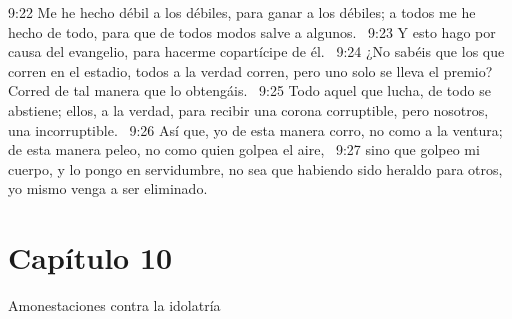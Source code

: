 9:22 Me he hecho débil a los débiles, para ganar a los débiles; a todos me he hecho de todo, para que de todos modos salve a algunos.  
9:23 Y esto hago por causa del evangelio, para hacerme copartícipe de él.  
9:24 ¿No sabéis que los que corren en el estadio, todos a la verdad corren, pero uno solo se lleva el premio? Corred de tal manera que lo obtengáis.  
9:25 Todo aquel que lucha, de todo se abstiene; ellos, a la verdad, para recibir una corona corruptible, pero nosotros, una incorruptible.  
9:26 Así que, yo de esta manera corro, no como a la ventura; de esta manera peleo, no como quien golpea el aire,  
9:27 sino que golpeo mi cuerpo, y lo pongo en servidumbre, no sea que habiendo sido heraldo para otros, yo mismo venga a ser eliminado.  
\section*{Capítulo 10}
Amonestaciones contra la idolatría  

